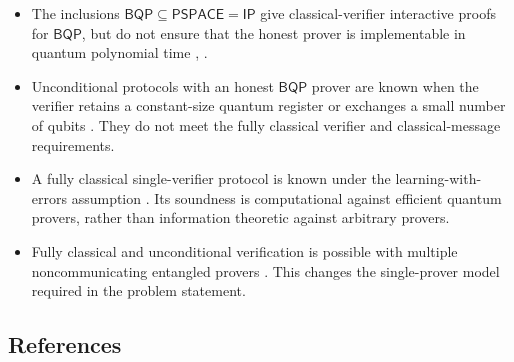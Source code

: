 \begin{itemize}
  \item The inclusions
  $\mathsf{BQP}\subseteq\mathsf{PSPACE}=\mathsf{IP}$ give classical-verifier
  interactive proofs for $\mathsf{BQP}$, but do not ensure that the honest
  prover is implementable in quantum polynomial time
  ,
  .

  \item Unconditional protocols with an honest $\mathsf{BQP}$ prover are
  known when the verifier retains a constant-size quantum register or
  exchanges a small number of qubits
  .  They do not meet the fully classical
  verifier and classical-message requirements.

  \item A fully classical single-verifier protocol is known under the
  learning-with-errors assumption
  .  Its soundness is computational against
  efficient quantum provers, rather than information theoretic against
  arbitrary provers.

  \item Fully classical and unconditional verification is possible with
  multiple noncommunicating entangled provers
  .  This changes the single-prover model
  required in the problem statement.
\end{itemize}

\subsection*{References}

